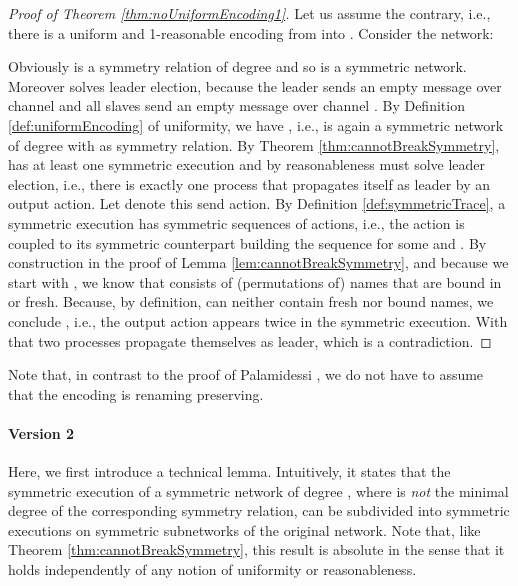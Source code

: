 \documentclass[11pt,techReport]{eptcs}
\begin{document}
\begin{proof}[Proof of Theorem \ref{thm:noUniformEncoding1}]
	Let us assume the contrary, i.e., there is a uniform and 1-reasonable encoding  from \pimix into \pisep. Consider the network:
	
	Obviously  is a symmetry relation of degree  and so  is a symmetric network. Moreover  solves leader election, because the leader sends an empty message over channel  and all slaves send an empty message over channel . By Definition \ref{def:uniformEncoding} of uniformity, we have , i.e.,  is again a symmetric network of degree  with  as symmetry relation. By Theorem \ref{thm:cannotBreakSymmetry},  has at least one symmetric execution and by reasonableness  must solve leader election, i.e., there is exactly one process that propagates itself as leader by an output action. Let  denote this send action. By Definition \ref{def:symmetricTrace}, a symmetric execution has symmetric sequences of actions, i.e., the action  is coupled to its symmetric counterpart building the sequence  for some  and . By construction in the proof of Lemma \ref{lem:cannotBreakSymmetry}, and because we start with , we know that  consists of (permutations of) names that are bound in  or fresh. Because, by definition,  can neither contain fresh nor bound names, we conclude , i.e., the output action appears twice in the symmetric execution. With that two processes propagate themselves as leader, which is a contradiction.
\end{proof}


Note that, in contrast to the proof of Palamidessi \cite{palamidessi03,vigliottiPhillipsPalamidessi07}, we do not have to assume that the encoding is renaming preserving.






\paragraph{Version 2}

Here, we first introduce a technical lemma. Intuitively, it states that the symmetric execution of a symmetric network of degree , where  is \emph{not} the minimal degree of the corresponding symmetry relation, can be subdivided into symmetric executions on symmetric subnetworks of the original network.
\noindent 
Note that, like Theorem \ref{thm:cannotBreakSymmetry}, this result is absolute in the sense that it holds independently of any notion of uniformity or reasonableness. 
\end{document}
